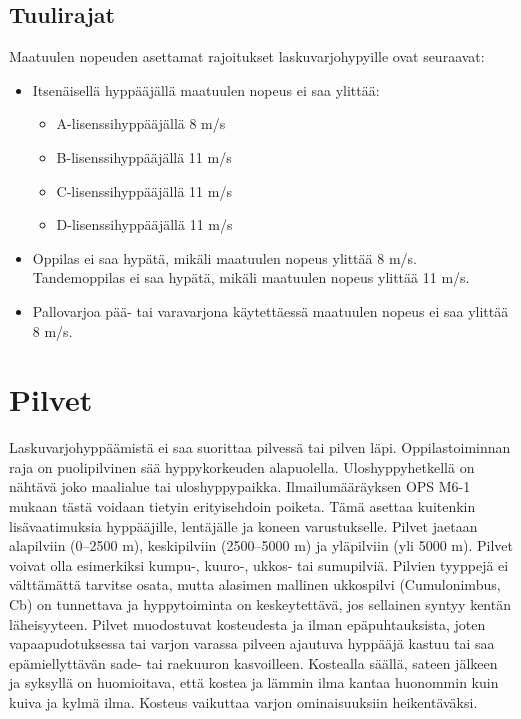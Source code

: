 \subsection{Tuulirajat}
\label{saaoppi-tuulirajat}


Maatuulen nopeuden asettamat rajoitukset laskuvarjohypyille ovat seuraavat: 

\begin{itemize}
\item Itsenäisellä hyppääjällä maatuulen nopeus ei saa ylittää: 
	\begin{itemize}
	\item  A-lisenssihyppääjällä 8 m/s 
	\item  B-lisenssihyppääjällä 11 m/s 
	\item  C-lisenssihyppääjällä 11 m/s 
	\item  D-lisenssihyppääjällä 11 m/s 
	\end{itemize}
\item  Oppilas ei saa hypätä, mikäli maatuulen nopeus ylittää 8 m/s. Tandemoppilas ei saa hypätä, mikäli maatuulen nopeus ylittää 11 m/s. 
\item  Pallovarjoa pää- tai varavarjona käytettäessä maatuulen nopeus ei saa ylittää 8 m/s. 
\end{itemize}
\section{Pilvet}
\label{saaoppi-pilvet}


Laskuvarjohyppäämistä ei saa suorittaa pilvessä tai pilven läpi. Oppilastoiminnan raja on puolipilvinen sää hyppykorkeuden alapuolella. Uloshyppyhetkellä on nähtävä joko maalialue tai uloshyppypaikka. Ilmailumääräyksen OPS M6-1 mukaan tästä voidaan tietyin erityisehdoin poiketa. Tämä asettaa kuitenkin lisävaatimuksia hyppääjille, lentäjälle ja koneen varustukselle. Pilvet jaetaan alapilviin (0–2500 m), keskipilviin (2500–5000 m) ja yläpilviin (yli 5000 m). Pilvet voivat olla esimerkiksi kumpu\mbox{-,} kuuro\mbox{-,} ukkos- tai sumupilviä. Pilvien tyyppejä ei välttämättä tarvitse osata, mutta alasimen mallinen ukkospilvi (Cumulonimbus, Cb) on tunnettava ja hyppytoiminta on keskeytettävä, jos sellainen syntyy kentän läheisyyteen. Pilvet muodostuvat kosteudesta ja ilman epäpuhtauksista, joten vapaapudotuksessa tai varjon varassa pilveen ajautuva hyppääjä kastuu tai saa epämiellyttävän sade- tai raekuuron kasvoilleen. Kostealla säällä, sateen jälkeen ja syksyllä on huomioitava, että kostea ja lämmin ilma kantaa huonommin kuin kuiva ja kylmä ilma. Kosteus vaikuttaa varjon ominaisuuksiin heikentäväksi. 



